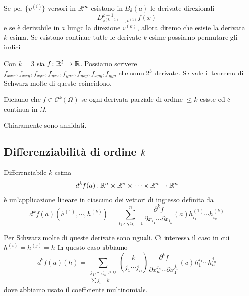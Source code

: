 \documentclass[a4paper]{article}
\begin{document}
\begin{radioactive}
Se per \(\{v^{(i)}\}\) versori in \(\mathbb{R}^m\)
esistono in \(B_\delta(a)\) le derivate direzionali
\[
    D_{v^{(k-1)}, \cdots, v^{(1)}}^{k-1}f(x)
\]
e se è derivabile in \(a\) lungo la direzione \(v^{(k)}\),
allora diremo che esiste la derivata \(k\)-esima.
Se esistono continue tutte le derivate \(k\) esime possiamo permutare gli indici.

\begin{snippetexample}{}
    Con \(k=3\) sia \(f \colon \mathbb{R}^2 \to \mathbb{R}\).
    Possiamo scrivere \(f_{xxx},f_{xxy},f_{xyx},f_{yxx},f_{yyx},f_{yxy}, f_{xyy}, f_{yyy}\)
    che sono \(2^3\) derivate.
    Se vale il teorema di Schwarz molte di queste coincidono.
\end{snippetexample}
\end{radioactive}

\begin{radioactive}
\begin{snippetdefinition}{}
    Diciamo che \(f \in \mathcal{C}^k(\Omega)\) se ogni derivata parziale di ordine \(\leq k\)
    esiste ed è continua in \(\Omega\).
\end{snippetdefinition}
Chiaramente sono annidati.
\end{radioactive}

\subsection{Differenziabilità di ordine \(k\)}

\begin{radioactive}
\begin{snippetdefinition}{Differenziabile \(k\)-esima}
    \[
        d^k f(a) \colon \mathbb{R}^n \times \mathbb{R}^n \times \cdots \times \mathbb{R}^n \to \mathbb{R}^n
    \]
    è un'applicazione lineare in ciascuno dei vettori di ingresso definita da
    \[
        d^k f(a) (h^{(1)}, \cdots, h^{(k)})
        = \sum_{i_1, \cdots, i_k = 1}^n \frac{\partial^k f}{\partial x_{i_1} \cdots \partial x_{i_k}}(a)
        h_{i_1}^{(1)} \cdots h_{i_k}^{(k)}
    \]
\end{snippetdefinition}

Per Schwarz molte di queste derivate sono uguali.
Ci interessa il caso in cui \(h^{(i)} = h^{(j)} = h\)
In questo caso abbiamo
\[
    d^k f(a)(h) = \sum_{\substack{j_1, \cdots, j_n \geq 0 \\ \sum j_i = k}}
    \binom{k}{j_1 \cdots j_n} \frac{\partial^k f}{\partial x^{j_n}_n \cdots \partial x^{j_1}_1}(a)
    h^{j_1}_1 \cdots h_n^{j_n}
\]
dove abbiamo usato il coefficiente multinomiale.
\end{radioactive}
\end{document}
